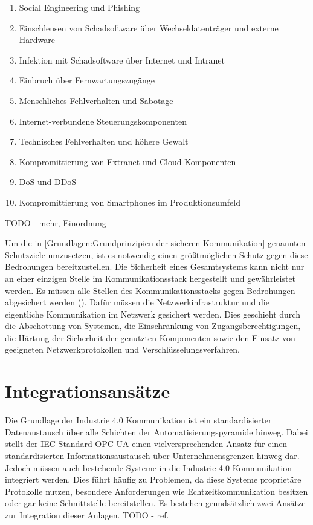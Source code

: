 \begin{enumerate}
    \item Social Engineering und Phishing
    \item Einschleusen von Schadsoftware über Wechseldatenträger und externe Hardware
    \item Infektion mit Schadsoftware über Internet und Intranet
    \item Einbruch über Fernwartungszugänge
    \item Menschliches Fehlverhalten und Sabotage
    \item Internet-verbundene Steuerungskomponenten
    \item Technisches Fehlverhalten und höhere Gewalt
    \item Kompromittierung von Extranet und Cloud Komponenten
    \item \ac{DoS} und \ac{DDoS}
    \item Kompromittierung von Smartphones im Produktionsumfeld
\end{enumerate}

TODO - mehr, Einordnung

Um die in \autoref{Grundlagen:Grundprinzipien der sicheren Kommunikation} genannten Schutzziele umzusetzen, ist es notwendig einen größtmöglichen Schutz gegen diese Bedrohungen bereitzustellen. Die Sicherheit eines Gesamtsystems kann nicht nur an einer einzigen Stelle im Kommunikationsstack hergestellt und gewährleistet werden. Es müssen alle Stellen des Kommunikationsstacks gegen Bedrohungen abgesichert werden (\cite{sichKom2017}). Dafür müssen die Netzwerkinfrastruktur und die eigentliche Kommunikation im Netzwerk gesichert werden. Dies geschieht durch die Abschottung von Systemen, die Einschränkung von Zugangsberechtigungen, die Härtung der Sicherheit der genutzten Komponenten sowie den Einsatz von geeigneten Netzwerkprotokollen und Verschlüsselungsverfahren.

\section{Integrationsansätze}
Die Grundlage der Industrie 4.0 Kommunikation ist ein standardisierter Datenaustausch über alle Schichten der Automatisierungspyramide hinweg. Dabei stellt der \ac{IEC}-Standard \ac{OPC UA} einen vielversprechenden Ansatz für einen standardisierten Informationsaustausch über Unternehmensgrenzen hinweg dar. Jedoch müssen auch bestehende Systeme in die Industrie 4.0 Kommunikation integriert werden. Dies führt häufig zu Problemen, da diese Systeme proprietäre Protokolle nutzen, besondere Anforderungen wie Echtzeitkommunikation besitzen oder gar keine Schnittstelle bereitstellen. Es bestehen grundsätzlich zwei Ansätze zur Integration dieser Anlagen. TODO - ref.

